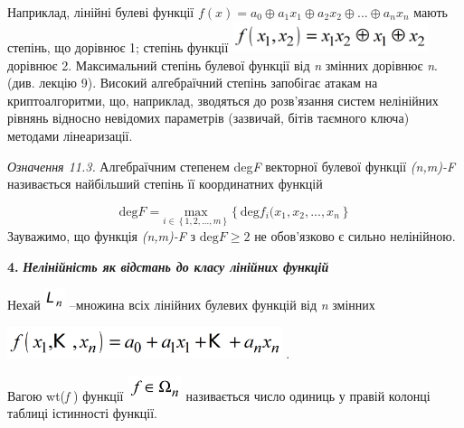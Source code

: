\documentclass[a4paper]{article}
\newcounter{}
\begin{document}
Наприклад, лінійні булеві функції  
${f(x)=a_{{0}}{\oplus}a_{{1}}x_{{1}}{\oplus}a_{{2}}x_{{2}}{\oplus}\text{.}\text{.}\text{.}{\oplus}a_{{n}}x_{{n}}}$
мають степінь, що дорівнює 1; степінь функції 
\includegraphics[width=2.248in,height=0.3583in]{crypt-img/crypt-img258.png}  
дорівнює  2. Максимальний степінь булевої функції від \textit{n} змінних
дорівнює \textit{n}. (див. лекцію 9). Високий алгебраїчний степінь запобігає
атакам на криптоалгоритми, що, наприклад, зводяться до розв’язання систем
нелінійних рівнянь відносно невідомих параметрів (зазвичай, бітів таємного
ключа) методами лінеаризації. 

 \textit{Означення 11.3.} Алгебраїчним степенем deg\textit{F}\textit{ }
векторної булевої функції 
\textit{(}\textit{n}\textit{,}\textit{m}\textit{)-}\textit{F}\textit{ 
}називається найбільший степінь її координатних функцій

\begin{equation*}
{\text{deg}F=\underset{{i\in
\left\{1,2,\text{.}\text{.}\text{.},m\right\}}}{{\text{max}}}\left\{\text{deg}f_{{i}}(x_{{1}},x_{{2}},\text{.}\text{.}\text{.},x_{{n}}\right\}}
\end{equation*}
Зауважимо, що функція
\textit{(}\textit{n}\textit{,}\textit{m}\textit{)-}\textit{F}\textit{ } з 
${\text{deg}F\ge 2}$ не обов’язково є сильно нелінійною.


\bigskip

\textbf{4.} \textbf{\textit{Нелінійність як відстань до класу лінійних функцій}}

Нехай 
\includegraphics[width=0.2362in,height=0.25in]{crypt-img/crypt-img259.png} 
–множина всіх лінійних булевих функцій від \textit{n}\textit{ }змінних 

{\centering
 \includegraphics[width=3.1618in,height=0.3693in]{crypt-img/crypt-img260.png} .
\par}

 Вагою wt(\textit{f}\textit{ })\textit{ }функції 
\includegraphics[width=0.6217in,height=0.2874in]{crypt-img/crypt-img261.png} 
називається число одиниць у правій колонці таблиці істинності функції.
\end{document}

